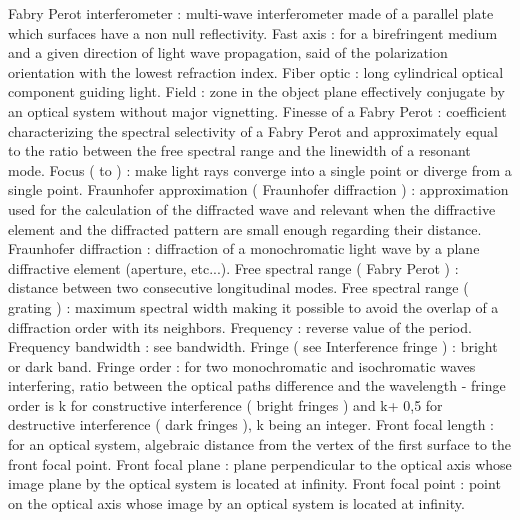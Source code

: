 Fabry Perot interferometer                           : multi-wave interferometer made of a parallel plate which surfaces have a non null reflectivity.
Fast axis                                            : for a birefringent medium and a given direction of light wave propagation, said of the polarization orientation with the lowest refraction index.
Fiber optic                                          : long cylindrical optical component guiding light.
Field                                                : zone in the object plane effectively conjugate by an optical system without major vignetting.
Finesse of a Fabry Perot                             : coefficient characterizing the spectral selectivity of a Fabry Perot and approximately equal to the ratio between the free spectral range and the linewidth of a resonant mode.
Focus ( to )                                         : make light rays converge into a single point or diverge from a single point.
Fraunhofer approximation ( Fraunhofer diffraction )  : approximation used for the calculation of the diffracted wave and relevant when the diffractive element and the diffracted pattern are small enough regarding their distance.
Fraunhofer diffraction                               : diffraction of a monochromatic light wave by a plane diffractive element (aperture, etc...).
Free spectral range ( Fabry Perot )                  : distance between two consecutive longitudinal modes.
Free spectral range ( grating )                      : maximum spectral width making it possible to avoid the overlap of a diffraction order with its neighbors.
Frequency                                            : reverse value of the period.
Frequency bandwidth                                  : see bandwidth.
Fringe ( see Interference fringe )                   : bright or dark band.
Fringe order                                         : for two monochromatic and isochromatic waves interfering, ratio between the optical paths difference and the wavelength - fringe order is k for constructive interference ( bright fringes ) and k+ 0,5 for destructive interference ( dark fringes ), k being an integer.
Front focal length                                   : for an optical system, algebraic distance from the vertex of the first surface to the front focal point.
Front focal plane                                    : plane perpendicular to the optical axis whose image plane by the optical system is located at infinity.
Front focal point                                    : point on the optical axis whose image by an optical system is located at infinity.
